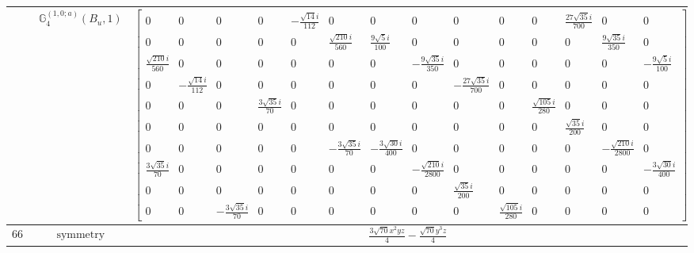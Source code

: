 \documentclass[fleqn,8pt,landscape]{jsarticle}
\begin{document}
\begin{longtable}{ccc}
$  $ & $ \mathbb{G}_{4}^{(1,0;a)}(B_{u},1) $ & $ \begin{bmatrix} 0 & 0 & 0 & 0 & - \frac{\sqrt{14} i}{112} & 0 & 0 & 0 & 0 & 0 & 0 & \frac{27 \sqrt{35} i}{700} & 0 & 0 \\ 0 & 0 & 0 & 0 & 0 & \frac{\sqrt{210} i}{560} & \frac{9 \sqrt{5} i}{100} & 0 & 0 & 0 & 0 & 0 & \frac{9 \sqrt{35} i}{350} & 0 \\ \frac{\sqrt{210} i}{560} & 0 & 0 & 0 & 0 & 0 & 0 & - \frac{9 \sqrt{35} i}{350} & 0 & 0 & 0 & 0 & 0 & - \frac{9 \sqrt{5} i}{100} \\ 0 & - \frac{\sqrt{14} i}{112} & 0 & 0 & 0 & 0 & 0 & 0 & - \frac{27 \sqrt{35} i}{700} & 0 & 0 & 0 & 0 & 0 \\ 0 & 0 & 0 & \frac{3 \sqrt{35} i}{70} & 0 & 0 & 0 & 0 & 0 & 0 & \frac{\sqrt{105} i}{280} & 0 & 0 & 0 \\ 0 & 0 & 0 & 0 & 0 & 0 & 0 & 0 & 0 & 0 & 0 & \frac{\sqrt{35} i}{200} & 0 & 0 \\ 0 & 0 & 0 & 0 & 0 & - \frac{3 \sqrt{35} i}{70} & - \frac{3 \sqrt{30} i}{400} & 0 & 0 & 0 & 0 & 0 & - \frac{\sqrt{210} i}{2800} & 0 \\ \frac{3 \sqrt{35} i}{70} & 0 & 0 & 0 & 0 & 0 & 0 & - \frac{\sqrt{210} i}{2800} & 0 & 0 & 0 & 0 & 0 & - \frac{3 \sqrt{30} i}{400} \\ 0 & 0 & 0 & 0 & 0 & 0 & 0 & 0 & \frac{\sqrt{35} i}{200} & 0 & 0 & 0 & 0 & 0 \\ 0 & 0 & - \frac{3 \sqrt{35} i}{70} & 0 & 0 & 0 & 0 & 0 & 0 & \frac{\sqrt{105} i}{280} & 0 & 0 & 0 & 0 \end{bmatrix} $ \\ \hline
$ 667 $ & $ \text{symmetry} $ & $ \frac{3 \sqrt{70} x^{2} y z}{4} - \frac{\sqrt{70} y^{3} z}{4} $ \\

\end{longtable}
\end{document}
